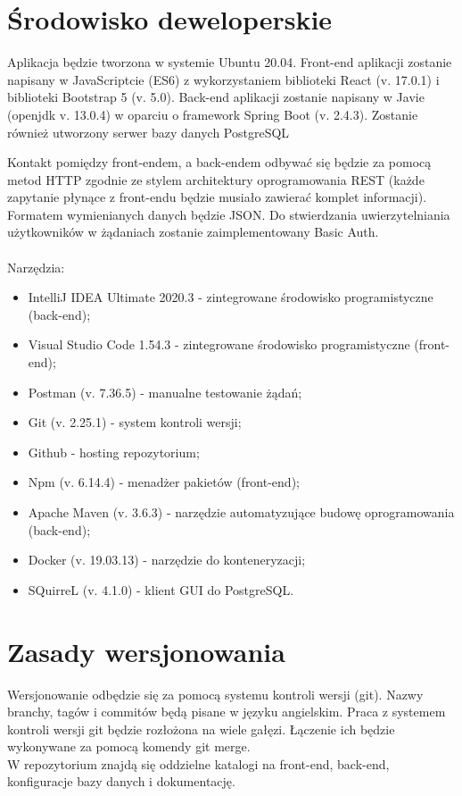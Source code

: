 \documentclass{article}
\begin{document}
\section{Środowisko deweloperskie}
{\fontsize{12}{12}\selectfont
    Aplikacja będzie tworzona w systemie Ubuntu 20.04. Front-end aplikacji zostanie napisany w JavaScriptcie (ES6) z wykorzystaniem biblioteki React (v. 17.0.1) i biblioteki Bootstrap 5 (v. 5.0). Back-end aplikacji zostanie napisany w Javie (openjdk v. 13.0.4) w oparciu o framework Spring Boot (v. 2.4.3). Zostanie również utworzony serwer bazy danych PostgreSQL 
    
    Kontakt pomiędzy front-endem, a back-endem odbywać się będzie za pomocą metod HTTP zgodnie ze stylem architektury oprogramowania REST (każde zapytanie płynące z front-endu będzie musiało zawierać komplet informacji). Formatem wymienianych danych będzie JSON. Do stwierdzania uwierzytelniania użytkowników w żądaniach zostanie zaimplementowany Basic Auth. \\
    
    \\ 
    Narzędzia:
    \begin{itemize}
        \item IntelliJ IDEA Ultimate 2020.3 - zintegrowane środowisko programistyczne (back-end);
        \item Visual Studio Code 1.54.3 - zintegrowane środowisko programistyczne (front-end);
        \item Postman (v. 7.36.5) - manualne testowanie żądań;
        \item Git (v. 2.25.1) - system kontroli wersji;
        \item Github - hosting repozytorium;
        \item Npm (v. 6.14.4) - menadżer pakietów (front-end);
        \item Apache Maven (v. 3.6.3) - narzędzie automatyzujące budowę oprogramowania (back-end);
        \item Docker (v. 19.03.13) - narzędzie do konteneryzacji;
        \item SQuirreL (v. 4.1.0) - klient GUI do PostgreSQL.
    \end{itemize}
}


\section{Zasady wersjonowania}
{\fontsize{12}{12}\selectfont
    Wersjonowanie odbędzie się za pomocą systemu kontroli wersji (git).
    Nazwy branchy, tagów i commitów będą pisane w języku angielskim.  
    Praca z systemem kontroli wersji git będzie rozłożona na wiele gałęzi. 
    Łączenie ich będzie wykonywane za pomocą komendy git merge. \\

    W repozytorium znajdą się oddzielne katalogi na front-end, back-end, konfiguracje bazy danych i dokumentację.
}
\end{document}
